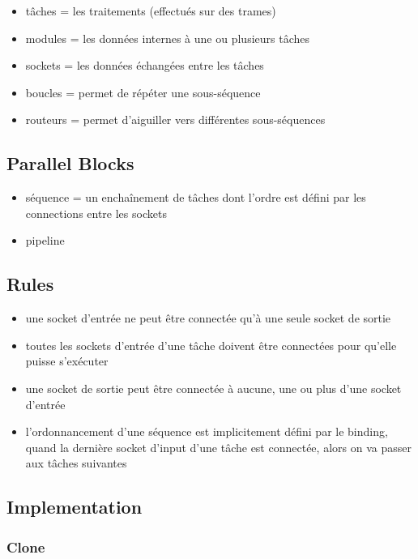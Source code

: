 \begin{itemize}
  \item tâches = les traitements (effectués sur des trames)
  \item modules = les données internes à une ou plusieurs tâches
  \item sockets = les données échangées entre les tâches
  \item boucles = permet de répéter une sous-séquence
  \item routeurs = permet d'aiguiller vers différentes sous-séquences
\end{itemize}

\subsection{Parallel Blocks}

\begin{itemize}
  \item séquence = un enchaînement de tâches dont l'ordre est défini par les
        connections entre les sockets
  \item pipeline
\end{itemize}

\subsection{Rules}

\begin{itemize}
  \item une socket d'entrée ne peut être connectée qu'à une seule socket de
        sortie
  \item toutes les sockets d'entrée d'une tâche doivent être connectées pour
        qu'elle puisse s'exécuter
  \item une socket de sortie peut être connectée à aucune, une ou plus d'une
        socket d'entrée
  \item l'ordonnancement d'une séquence est implicitement défini par le binding,
        quand la dernière socket d'input d'une tâche est connectée, alors on va
        passer aux tâches suivantes
\end{itemize}

\subsection{Implementation}

\subsubsection{Clone}


